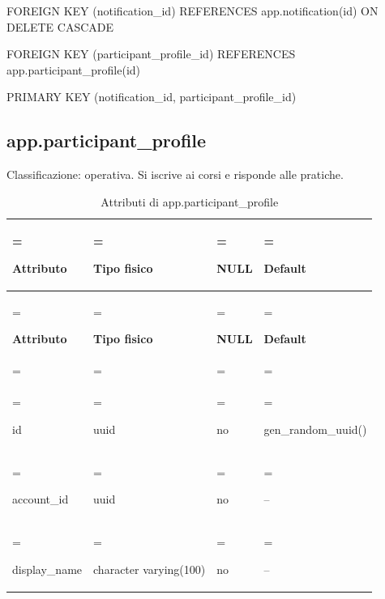 \documentclass[11pt,a4paper]{article}
\begin{document}
{\ttfamily\small FOREIGN KEY (\allowbreak{}notification\_\allowbreak{}id) REFERENCES app.\allowbreak{}notification(\allowbreak{}id) ON DELETE CASCADE}\par

{\ttfamily\small FOREIGN KEY (\allowbreak{}participant\_\allowbreak{}profile\_\allowbreak{}id) REFERENCES app.\allowbreak{}participant\_\allowbreak{}profile(\allowbreak{}id)}\par

{\ttfamily\small PRIMARY KEY (\allowbreak{}notification\_\allowbreak{}id,\allowbreak{} participant\_\allowbreak{}profile\_\allowbreak{}id)}\par

\subsection{app.participant\_profile}

Classificazione: operativa. Si iscrive ai corsi e risponde alle pratiche.

{\small \renewcommand{\arraystretch}{1.2}

\begin{xltabular}{\linewidth}{>{\hsize\linewidth=\hsize\raggedright\arraybackslash}X>{\hsize\linewidth=\hsize\raggedright\arraybackslash}X>{\hsize\linewidth=\hsize\raggedright\arraybackslash}X>{\hsize\linewidth=\hsize\raggedright\arraybackslash}X}
\caption{Attributi di app.participant\_profile}\label{tab:dictionary-17}\\
\toprule

\textbf{Attributo} & \textbf{Tipo fisico} & \textbf{NULL} & \textbf{Default}\\\midrule\endfirsthead\toprule\textbf{Attributo} & \textbf{Tipo fisico} & \textbf{NULL} & \textbf{Default}\\\midrule\endhead
\midrule{}\\\endfoot\bottomrule\endlastfoot


{\ttfamily\small id} & {\ttfamily\small uuid} & no & {\ttfamily\small gen\_\allowbreak{}random\_\allowbreak{}uuid(\allowbreak{})}\\\addlinespace[3pt]

{\ttfamily\small account\_\allowbreak{}id} & {\ttfamily\small uuid} & no & {\ttfamily\small --}\\\addlinespace[3pt]

{\ttfamily\small display\_\allowbreak{}name} & {\ttfamily\small character varying(\allowbreak{}100)} & no & {\ttfamily\small --}\\*

\end{xltabular}}
\end{document}
